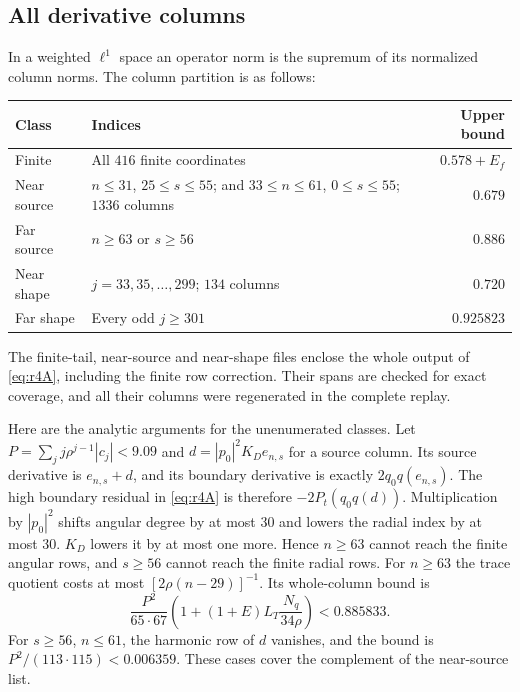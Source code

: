 \documentclass[11pt]{amsart}
\theoremstyle{remark}
\numberwithin{equation}{section}
\newcommand{\Pt}{P_t}
\begin{document}
\subsection{All derivative columns}
In a weighted $\ell^1$ space an operator norm is the supremum of its
normalized column norms. The column partition is as follows:
\begin{center}
\begin{tabular}{@{}p{}p{}r@{}}
\toprule
Class & Indices & Upper bound\\
\midrule
Finite & All $416$ finite coordinates & $0.578+E_f$\\
Near source & $n\le31$, $25\le s\le55$; and
 $33\le n\le61$, $0\le s\le55$; $1336$ columns & $0.679$\\
Far source & $n\ge63$ or $s\ge56$ & $0.886$\\
Near shape & $j=33,35,\ldots,299$; $134$ columns & $0.720$\\
Far shape & Every odd $j\ge301$ & $0.925823$\\
\bottomrule
\end{tabular}
\end{center}
The finite-tail, near-source and near-shape files enclose the whole
output of \eqref{eq:r4A}, including the finite row correction. Their
spans are checked for exact coverage, and all their columns were
regenerated in the complete replay.

Here are the analytic arguments for the unenumerated classes.
Let $P=\sum_jj\rho^{j-1}|c_j|<9.09$ and
$d=|p_0|^2K_De_{n,s}$ for a source column. Its source derivative is
$e_{n,s}+d$, and its boundary derivative is exactly $2q_0q(e_{n,s})$.
The high boundary residual in \eqref{eq:r4A} is therefore
$-2\Pt(q_0q(d))$. Multiplication by $|p_0|^2$ shifts angular degree by
at most $30$ and lowers the radial index by at most $30$.
$K_D$ lowers it by at most one more. Hence $n\ge63$ cannot reach the
finite angular rows, and $s\ge56$ cannot reach the finite radial rows.
For $n\ge63$ the trace quotient costs at most
$[2\rho(n-29)]^{-1}$. Its whole-column bound is
\begin{equation}\label{eq:r4farsource}
 \frac{P^2}{65\cdot67}
 \left(1+(1+E)L_T\frac{N_q}{34\rho}\right)<0.885833.
\end{equation}
For $s\ge56$, $n\le61$, the harmonic row of $d$ vanishes, and the bound
is $P^2/(113\cdot115)<0.006359$. These cases cover the complement of the
near-source list.
\end{document}
